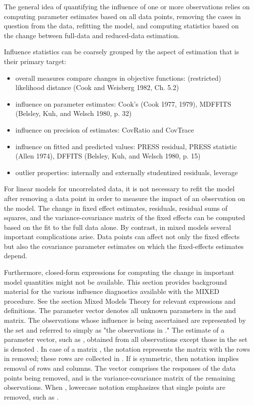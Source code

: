 \documentclass[12pt, a4paper]{report}
\begin{document}
The general idea of quantifying the influence of one or more observations relies on computing parameter estimates based on all data points, removing the cases in question from the data, refitting the model, and computing statistics based on the change between full-data and reduced-data estimation. 

Influence statistics can be coarsely grouped by the aspect of estimation that is their primary target:
\begin{itemize}
	\item overall measures compare changes in objective functions: (restricted) likelihood distance (Cook and Weisberg 1982, Ch. 5.2)
	\item influence on parameter estimates: Cook’s  (Cook 1977, 1979), MDFFITS (Belsley, Kuh, and Welsch 1980, p. 32)
	\item influence on precision of estimates: CovRatio and CovTrace
	\item influence on fitted and predicted values: PRESS residual, PRESS statistic (Allen 1974), DFFITS (Belsley, Kuh, and Welsch 1980, p. 15)
	\item outlier properties: internally and externally studentized residuals, leverage
\end{itemize}
For linear models for uncorrelated data, it is not necessary to refit the model after removing a data point in order to measure the impact of an observation on the model. The change in fixed effect estimates, residuals, residual sums of squares, and the variance-covariance matrix of the fixed effects can be computed based on the fit to the full data alone. By contrast, in mixed models several important complications arise. Data points can affect not only the fixed effects but also the covariance parameter estimates on which the fixed-effects estimates depend. 

Furthermore, closed-form expressions for computing the change in important model quantities might not be available.
This section provides background material for the various influence diagnostics available with the MIXED procedure. See the section Mixed Models Theory for relevant expressions and definitions. The parameter vector  denotes all unknown parameters in the  and  matrix.
The observations whose influence is being ascertained are represented by the set  and referred to simply as "the observations in ." The estimate of a parameter vector, such as , obtained from all observations except those in the set  is denoted . In case of a matrix , the notation  represents the matrix with the rows in  removed; these rows are collected in . If  is symmetric, then notation  implies removal of rows and columns. The vector  comprises the responses of the data points being removed, and  is the variance-covariance matrix of the remaining observations. When , lowercase notation emphasizes that single points are removed, such as .
\end{document}
